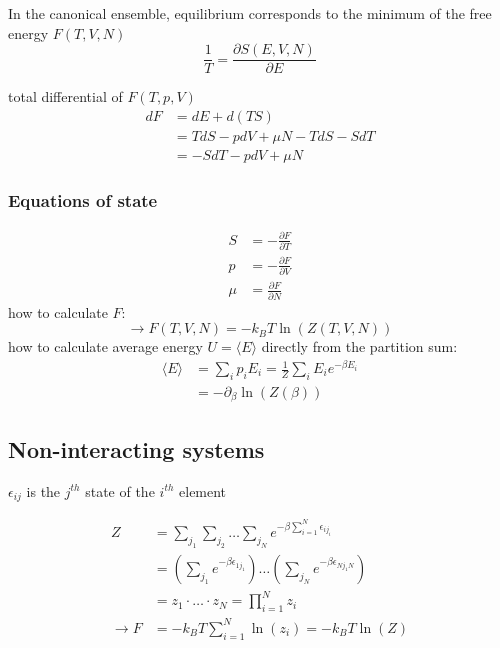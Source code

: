 In the canonical ensemble, equilibrium corresponds to the minimum of the
free energy $F(T,V,N)$
\begin{equation*}
    \frac{1}{T} = \frac{\partial S(E,V,N)}{\partial E}
\end{equation*}

total differential of $F(T,p,V)$
\begin{equation*}
    \begin{aligned}
        dF &= dE + d(TS) \\
        &= TdS - pdV + \mu N - TdS -SdT \\
        &= -SdT -pdV + \mu N
    \end{aligned}
\end{equation*}

\subsubsection*{Equations of state}
\begin{equation*}
    \begin{aligned}
        S &= - \frac{\partial F}{\partial T} \\
        p &= - \frac{\partial F}{\partial V} \\
        \mu &= \frac{\partial F}{\partial N}
    \end{aligned}
\end{equation*}
how to calculate $F$:
\begin{equation*}
    \rightarrow F(T,V,N) = -k_B T \ln(Z(T,V,N))
\end{equation*}
how to calculate average energy $U = \langle E \rangle$ directly from the partition sum:
\begin{equation*}
    \begin{aligned}
        \langle E \rangle &= \sum_i p_i E_i = \frac{1}{Z} \sum_i E_i e^{-\beta E_i} \\
        &= - \partial_\beta \ln (Z(\beta))
    \end{aligned}
\end{equation*}

\subsection*{Non-interacting systems}
$\epsilon_{ij}$ is the $j^{th}$ state of the $i^{th}$ element

\begin{equation*}
    \begin{aligned}
        Z &= \sum_{j_1} \sum_{j_2} \dots \sum_{j_N} e^{-\beta \sum_{i=1}^N \epsilon_{ij_i}} \\
        &= \left(\sum_{j_1} e^{-\beta \epsilon_{1j_1}}\right) \dots \left(\sum_{j_N} e^{-\beta \epsilon_{Nj_1N}}\right) \\
        &= z_1 \cdot \dots \cdot z_N = \prod_{i=1}^N z_i \\
        \rightarrow F &= -k_B T \sum_{i=1}^N \ln(z_i) = -k_B T \ln(Z)
    \end{aligned}
\end{equation*}

